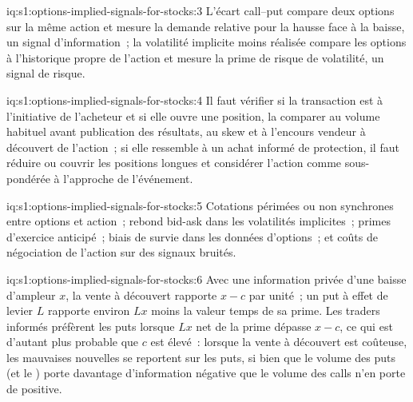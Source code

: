 \begin{solution}{iq:s1:options-implied-signals-for-stocks:3}
L'écart call--put compare deux options sur la même action et mesure la demande relative pour la hausse face à la baisse, un signal d'information~; la volatilité implicite moins
réalisée compare les options à l'historique propre de l'action et mesure la prime de risque de volatilité, un signal de risque.
\end{solution}

\begin{solution}{iq:s1:options-implied-signals-for-stocks:4}
Il faut vérifier si la transaction est à l'initiative de l'acheteur et si elle ouvre une position, la comparer au volume habituel avant publication des résultats, au skew et à l'encours vendeur à découvert de l'action~; si elle ressemble
à un achat informé de protection, il faut réduire ou couvrir les positions longues et considérer l'action comme sous-pondérée à l'approche de l'événement.
\end{solution}

\begin{solution}{iq:s1:options-implied-signals-for-stocks:5}
Cotations périmées ou non synchrones entre options et action~; rebond bid-ask dans les volatilités implicites~; primes d'exercice anticipé~; biais de survie dans les données d'options~; et
coûts de négociation de l'action sur des signaux bruités.
\end{solution}

\begin{solution}{iq:s1:options-implied-signals-for-stocks:6}
Avec une information privée d'une baisse d'ampleur $x$, la vente à découvert rapporte $x - c$ par unité~; un put à effet de levier $L$ rapporte environ $Lx$ moins la valeur temps de sa prime. Les
traders informés préfèrent les puts lorsque $Lx$ net de la prime dépasse $x - c$, ce qui est d'autant plus probable que $c$ est élevé~: lorsque la vente à découvert est coûteuse, les mauvaises nouvelles se reportent sur les puts, si bien que
le volume des puts (et le ) porte davantage d'information négative que le volume des calls n'en porte de positive.
\end{solution}
